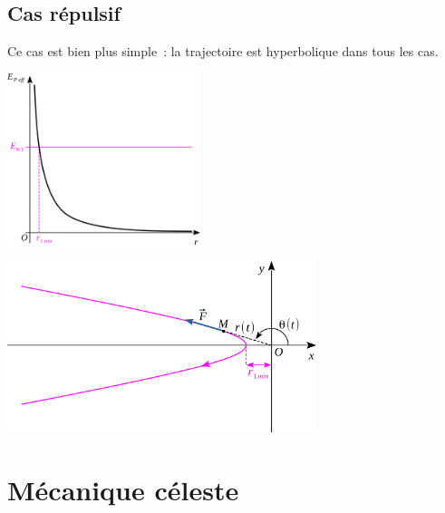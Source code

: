 \documentclass[../../main/main.tex]{subfiles}
\begin{document}
\subsection{Cas répulsif}
Ce cas est bien plus simple~: la trajectoire est hyperbolique dans tous les cas.
\smallbreak
\begin{minipage}[c]{0.48\linewidth}
	\begin{center}
		\includegraphics[height=5cm]{ep_eff-rep_color}
	\end{center}
\end{minipage}
\hfill
\begin{minipage}[c]{0.48\linewidth}
	\begin{center}
		\includegraphics[height=5cm]{traj_rep-color}
	\end{center}
\end{minipage}

\section{Mécanique céleste}
\end{document}
